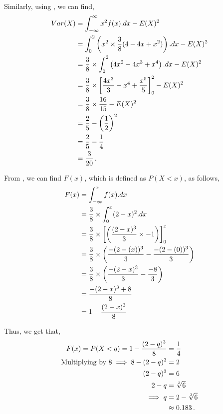 \begin{subquestions}
\begin{subsubquestions}
Similarly, using , we can find,
\begin{align}
  Var(X) & = \int_{-\infty}^{\infty}x^2 f(x).dx - E(X)^2 \nonumber \\
         & = \int_{0}^{2} \left(x^2 \times \frac{3}{8}(4-4x+x^2)\right).dx - E(X)^2 \nonumber \\
         & = \frac{3}{8} \times \int_{0}^{2} \left(4x^2-4x^3+x^4\right).dx - E(X)^2 \nonumber \\
         & = \frac{3}{8} \times \left[ \frac{4x^3}{3} - x^4 + \frac{x^5}{5}\right]_0^2 - E(X)^2 \nonumber \\
         & = \frac{3}{8} \times \frac{16}{15} - E(X)^2 \nonumber \\
         & = \frac{2}{5} - \left(\frac{1}{2}\right)^2 \nonumber \\
         & = \frac{2}{5} - \frac{1}{4} \nonumber \\
         & = \frac{3}{20} \,.
\end{align}


\subsubquestion

From , we can find $F(x)$, which is defined as $P(X<x)$, as follows,
\begin{align}
	F(x) & = \int_{-\infty}^{x} f(x).dx \nonumber \\
	     & = \frac{3}{8} \times \int_{0}^{x} (2-x)^2.dx \nonumber \\
	     & = \frac{3}{8} \times \left[\left(\frac{(2-x)^3}{3} \times -1 \right) \right]_0^x \nonumber \\
	     & = \frac{3}{8} \times \left(\frac{-(2-(x))^3}{3} - \frac{-(2-(0))^3}{3}\right) \nonumber \\
	     & = \frac{3}{8} \times \left(\frac{-(2-x)^3}{3} - \frac{-8}{3}\right) \nonumber \\
	     & = \frac{-(2-x)^3 + 8}{8} \nonumber \\
	     & = 1 - \frac{(2-x)^3}{8}
\end{align}

Thus, we get that,
\begin{align}
	F(x) = P(X<q) = 1 - \frac{(2-q)^3}{8} & = \frac{1}{4} \nonumber \\
	                \text{Multiplying by 8} \implies 8 - (2-q)^3 & = 2 \nonumber \\
	                (2-q)^3 & = 6 \nonumber \\
	                2-q & = \sqrt[3]{6} \nonumber \\
	                \implies q & = 2 - \sqrt[3]{6} \nonumber \\
	                & \approx 0.183 \,.
\end{align}

\end{subsubquestions}

\end{subquestions}



